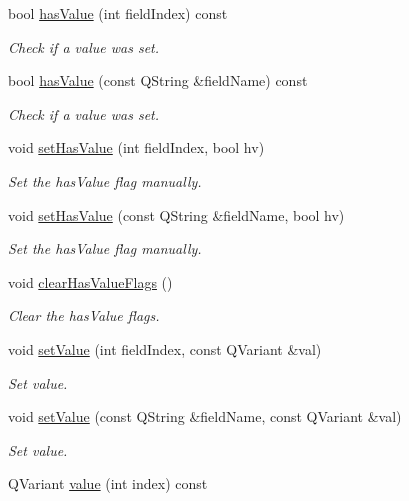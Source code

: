 \begin{DoxyCompactItemize}
bool \hyperlink{classmdt_sql_record_aa0ccfa8ae2bd37d33dbecf8d2bb2cd01}{has\-Value} (int field\-Index) const 
\begin{DoxyCompactList}\small\item\em Check if a value was set. \end{DoxyCompactList}\item 
bool \hyperlink{classmdt_sql_record_a581595f4425f824c794994eb564873cd}{has\-Value} (const Q\-String \&field\-Name) const 
\begin{DoxyCompactList}\small\item\em Check if a value was set. \end{DoxyCompactList}\item 
void \hyperlink{classmdt_sql_record_a747fbd01a47da46208001670df6b9690}{set\-Has\-Value} (int field\-Index, bool hv)
\begin{DoxyCompactList}\small\item\em Set the has\-Value flag manually. \end{DoxyCompactList}\item 
void \hyperlink{classmdt_sql_record_a91c4a584bb748f5376305d27299527dd}{set\-Has\-Value} (const Q\-String \&field\-Name, bool hv)
\begin{DoxyCompactList}\small\item\em Set the has\-Value flag manually. \end{DoxyCompactList}\item 
void \hyperlink{classmdt_sql_record_a634eb120a48b6c507b2bf57481e9f590}{clear\-Has\-Value\-Flags} ()
\begin{DoxyCompactList}\small\item\em Clear the has\-Value flags. \end{DoxyCompactList}\item 
void \hyperlink{classmdt_sql_record_a330291ff82fb8c7803c47d30f8939ed5}{set\-Value} (int field\-Index, const Q\-Variant \&val)
\begin{DoxyCompactList}\small\item\em Set value. \end{DoxyCompactList}\item 
void \hyperlink{classmdt_sql_record_a8bcaf65b449b6c82548735cdccb8cff1}{set\-Value} (const Q\-String \&field\-Name, const Q\-Variant \&val)
\begin{DoxyCompactList}\small\item\em Set value. \end{DoxyCompactList}\item 
Q\-Variant \hyperlink{classmdt_sql_record_a373eef777b0e51d2e8dc0904f992d609}{value} (int index) const 

\end{DoxyCompactItemize}
